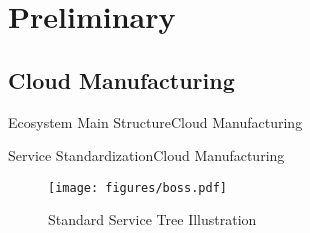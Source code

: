 \section{Preliminary}

\subsection{Cloud Manufacturing}
\begin{frame}{Ecosystem Main Structure}{Cloud Manufacturing}
\iffalse
\only<2>{
	\begin{figure}
	\centering
	\texttt{[image: figures/platformstruct.pdf]}
	\end{figure}
}
\only<3>{
	\begin{figure}
	\centering
	\texttt{[image: figures/platformstruct.pdf]}
	\end{figure}
}
\fi
\end{frame}

\begin{frame}{Service Standardization}{Cloud Manufacturing}
\begin{figure}
\centering
\texttt{[image: figures/boss.pdf]}
\caption{Standard Service Tree Illustration}
\end{figure}
\iffalse
\onslide<+->{
	Cloud Manufacturing Ecosystem provides a platform which distributed manufacturing resources/orders gathered as resources/orders hub.
}
\onslide<+->{
	\begin{block}{Related Methods}
	\begin{itemize}
	\item Resource Virtualization
	\item Construct Virtual Resource into Service Unit
	\item Service Standardization
	\item Order Decomposition into Tasks
	\end{itemize}
	\end{block}
}
\fi
\end{frame}

